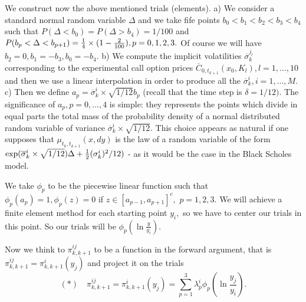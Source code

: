 \documentclass[a4paper]{article}
\begin{document}
We construct now the above mentioned trials (elements). a) We consider a
standard normal random variable $\Delta $ and we take fife points $%
b_{0}<b_{1}<b_{2}<b_{3}<b_{4}$ such that $P(\Delta <b_{0})=P(\Delta
>b_{4})=1/100$ and $P(b_{p}<\Delta <b_{p+1})=\frac{1}{4}\times (1-\frac{2}{%
100}),p=0,1,2,3.$ Of course we will have $b_{2}=0,b_{1}=-b_{3},b_{0}=-b_{4}.$
b) We compute the implicit volatilities $\overline{\sigma }_{k}^{j_{l}}$
corresponding to the experimental call option prices $\overline{C}%
_{0,t_{k+1}}(x_{0},K_{l}),l=1,...,10$ and then we use a linear interpolation
in order to produce all the $\overline{\sigma }_{k}^{i},i=1,...,M.$ c) Then
we define $a_{p}=\overline{\sigma }_{k}^{i}\times \sqrt{1/12}b_{p}$ (recall
that the time step is $\delta =1/12).$ The significance of $a_{p},p=0,...,4$
is simple: they represents the points which divide in equal parts the total
mass of the probability density of a normal distributed random variable of
variance $\overline{\sigma }_{k}^{i}\times \sqrt{1/12}.$ This choice appears
as natural if one supposes that $\mu _{t_{k},t_{k+1}}(x,dy)$ is the law of a
random variable of the form $\exp (\overline{\sigma }_{k}^{i}\times \sqrt{%
1/12})\Delta +\frac{1}{2}(\sigma _{k}^{i})^{2}/12)$ - as it would be the
case in the Black Scholes model.

We take $\phi _{p}$ to be the piecewise linear function such that
$\phi _{p}(a_{p})=1,\phi _{p}(z)=0$ if $z\in
[a_{p-1},a_{p+1}]^{c},$ $p=1,2,3.$ We will achieve a finite
element method for each starting point $y_{i},$ so we have to
center our trials in this point. So our trials will be $\phi
_{p}(\ln \frac{y}{y_{i}}).$

Now we think to $\pi _{k,k+1}^{ij}$ to be a function in the forward
argument, that is $\pi _{k,k+1}^{ij}=\pi _{k,k+1}^{i}(y_{j})$ and project it
on the trials
\[
(*)\quad \pi _{k,k+1}^{ij}=\pi _{k,k+1}^{i}(y_{j})=\sum_{p=1}^{3}\lambda
_{p}^{i}\phi _{p}(\ln \frac{y_{j}}{y_{i}}).
\]
\end{document}
